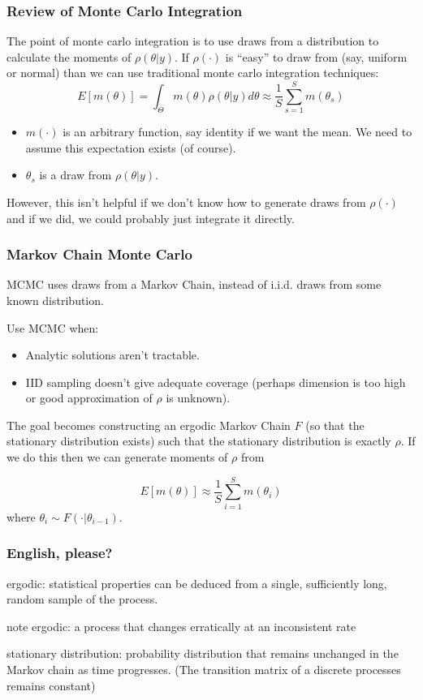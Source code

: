 \documentclass[11pt, aspectratio=169]{beamer}
\begin{document}
\begin{frame}[c]\frametitle{Review of Monte Carlo Integration}
    
The point of monte carlo integration is to use draws from a distribution to calculate the moments of $\rho(\theta|y)$. If $\rho(\cdot)$ is ``easy'' to draw from (say, uniform or normal) than we can use traditional monte carlo integration techniques: 
$$E[m(\theta)] = \int_\Theta m(\theta) \rho(\theta|y) d\theta \approx \frac{1}{S} \sum_{s=1}^S m(\theta_s)$$
\begin{itemize}
\item $m(\cdot)$ is an arbitrary function, say identity if we want the mean. We need to assume this expectation exists (of course).  
\item $\theta_s$ is a draw from $\rho(\theta|y)$. 
\end{itemize}

However, this isn't helpful if we don't know how to generate draws from $\rho(\cdot)$ and if we did, we could probably just integrate it directly. 


\end{frame}



\begin{frame}[c]\frametitle{Markov Chain Monte Carlo}
 
MCMC uses draws from a \alert{Markov Chain}, instead of i.i.d. draws from some known distribution. 

\vspace{.5em} 
Use MCMC when:
\begin{itemize}
\item Analytic solutions aren't tractable. 
\item IID sampling doesn't give adequate coverage (perhaps dimension is too high or good approximation of $\rho$ is unknown). 
\end{itemize}


The goal becomes constructing an \alert{ergodic} Markov Chain $F$ (so that the \alert{stationary distribution} exists) such that the stationary
distribution is exactly $\rho$.  If we do this then we can generate moments of $\rho$ from

$$ E[m(\theta)] \approx \frac{1}{S} \sum_{i=1}^S m(\theta_i) $$
where $\theta_i \sim F(\cdot | \theta_{i-1})$. 

\end{frame}


\begin{frame}[c]\frametitle{English, please?}
    

ergodic: statistical properties can be deduced from a single, sufficiently long, random sample of the process. 

\vspace{2em}
note ergodic: a process that changes erratically at an inconsistent rate

\vspace{2em}
stationary distribution: probability distribution that remains unchanged in the Markov chain as time progresses. (The transition matrix of a discrete processes remains constant)

\end{frame}
\end{document}
